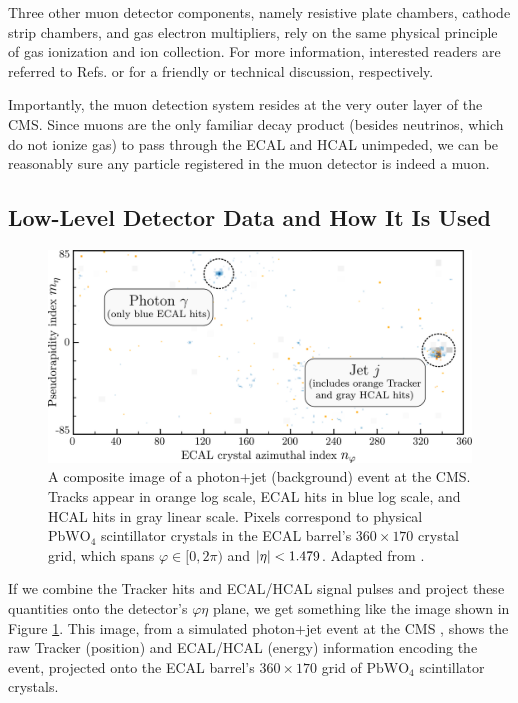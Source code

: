 \documentclass[11pt, a4paper]{article}
\newcommand{\chem}[1]{\ensuremath{\mathrm{#1}}}  %
\begin{document}
Three other muon detector components, namely resistive plate chambers, cathode strip chambers, and gas electron multipliers, rely on the same physical principle of gas ionization and ion collection.
For more information, interested readers are referred to Refs. \cite{muon-web} or \cite{muon-tdr} for a friendly or technical discussion, respectively.

Importantly, the muon detection system resides at the very outer layer of the CMS.
Since muons are the only familiar decay product (besides neutrinos, which do not ionize gas) to pass through the ECAL and HCAL unimpeded, we can be reasonably sure any particle registered in the muon detector is indeed a muon.

\subsection{Low-Level Detector Data and How It Is Used} \label{ss:three-methods}

\begin{figure}[htb!]
    \centering
    \includegraphics[width=\linewidth]{raster/raster-svg/event-image.pdf}
    \caption{A composite image of a photon+jet (background) event at the CMS.
    Tracks appear in orange log scale, ECAL hits in blue log scale, and HCAL hits in gray linear scale.
    Pixels correspond to physical \chem{PbWO_4} scintillator crystals in the ECAL barrel's $ 360 \times 170 $ crystal grid, which spans $ \varphi \in [0, 2\pi) $ and $ \abs{\eta} < 1.479$.
    Adapted from \cite{andrews-higgs}.}
    \label{fig:data-raw-ecal}
\end{figure}

If we combine the Tracker hits and ECAL/HCAL signal pulses and project these quantities onto the detector's $ \varphi \eta $ plane, we get something like the image shown in Figure \ref{fig:data-raw-ecal}.
This image, from a simulated photon+jet event at the CMS \cite{data-bg-jet}, shows the raw Tracker (position) and ECAL/HCAL (energy) information encoding the event, projected onto the ECAL barrel's $ 360 \times 170 $ grid of \chem{PbWO_4} scintillator crystals.
\end{document}

